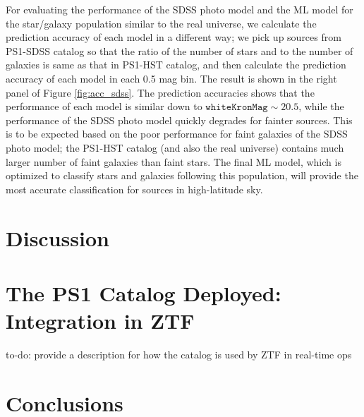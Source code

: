 \documentclass[twocolumn]{aastex62}
\newcommand{\todo}[1]{{\color{magenta} to-do: {#1}}}
\begin{document}
{For evaluating the performance of the SDSS photo model and the ML model 
for the star/galaxy population similar to the real universe, 
we calculate the prediction accuracy of each model in a different way; 
we pick up sources from PS1-SDSS catalog 
so that the ratio of the number of stars and to the number of galaxies 
is same as that in PS1-HST catalog, and then calculate the prediction accuracy of each model in each 0.5 mag bin. 
The result is shown in the right panel of Figure \ref{fig:acc_sdss}. 
The prediction accuracies shows that the performance of each model is similar 
down to $\mathtt{whiteKronMag} \sim20.5$, 
while the performance of the SDSS photo model quickly degrades for fainter sources. 
This is to be expected based on the poor performance for faint galaxies of the SDSS photo model; 
the PS1-HST catalog (and also the real universe) contains much larger number of faint galaxies than faint stars. 
The final ML model, which is optimized to classify stars and galaxies following this population, 
will provide the most accurate classification for sources in high-latitude sky. 
} 
\section{Discussion}

\section{The PS1 Catalog Deployed: Integration in ZTF}

\todo{provide a description for how the catalog is used by ZTF in real-time ops}

\section{Conclusions}
\end{document}
